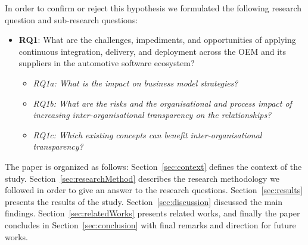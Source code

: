 In order to confirm or reject this hypothesis we formulated the following research question and sub-research questions:

\begin{itemize}
\item {\bf RQ1}: What are the challenges, impediments, and opportunities of applying continuous
integration, delivery, and deployment across the OEM and its suppliers in the
automotive software ecosystem?
\begin{itemize}
\item {\em RQ1a: What is the impact on business model strategies?}
\item {\em RQ1b: What are the risks and the organisational and process impact of increasing
inter-organisational transparency on the relationships?}
\item {\em RQ1c: Which existing concepts can benefit inter-organisational transparency?}
\end{itemize}
\end{itemize}



The paper is organized as follows: Section~\ref{sec:context} defines the context of the study. Section~\ref{sec:researchMethod} describes the research methodology we followed in order to give an answer to the research questions. Section~\ref{sec:results} presents the results of the study. Section~\ref{sec:discussion} discussed the main findings. Section~\ref{sec:relatedWorks} presents related works, and finally the paper concludes in Section~\ref{sec:conclusion} with final remarks and direction for future works.

